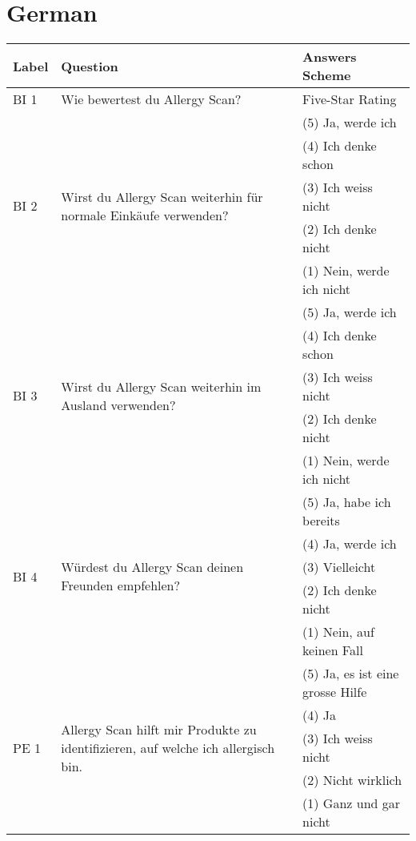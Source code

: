 \section*{German}
\centering
\begin{longtable}{p{1cm} p{8cm} p{5.5cm}}
\toprule
Label & Question & Answers Scheme\\
\midrule

BI 1 & Wie bewertest du Allergy Scan? & Five-Star Rating \\

\hline

\multirow{5}{*}{BI 2}
& \multirow{5}{8cm}{Wirst du Allergy Scan weiterhin für normale Einkäufe verwenden?}
& (5) Ja, werde ich\\ 
& & (4) Ich denke schon\\
& & (3) Ich weiss nicht\\
& & (2) Ich denke nicht\\
& & (1) Nein, werde ich nicht\\

\hline

\multirow{5}{*}{BI 3}
& \multirow{5}{8cm}{Wirst du Allergy Scan weiterhin im Ausland verwenden?}
& (5) Ja, werde ich\\ 
& & (4) Ich denke schon\\
& & (3) Ich weiss nicht\\
& & (2) Ich denke nicht\\
& & (1) Nein, werde ich nicht\\

\hline

\multirow{5}{*}{BI 4}
& \multirow{5}{8cm}{Würdest du Allergy Scan deinen Freunden empfehlen?}
& (5) Ja, habe ich bereits\\ 
& & (4) Ja, werde ich\\
& & (3) Vielleicht\\
& & (2) Ich denke nicht\\
& & (1) Nein, auf keinen Fall\\

\hline

\multirow{5}{*}{PE 1}
& \multirow{5}{8cm}{Allergy Scan hilft mir Produkte zu identifizieren, auf welche ich allergisch bin.}
& (5) Ja, es ist eine grosse Hilfe\\ 
& & (4) Ja\\
& & (3) Ich weiss nicht\\
& & (2) Nicht wirklich\\
& & (1) Ganz und gar nicht\\


\end{longtable}
